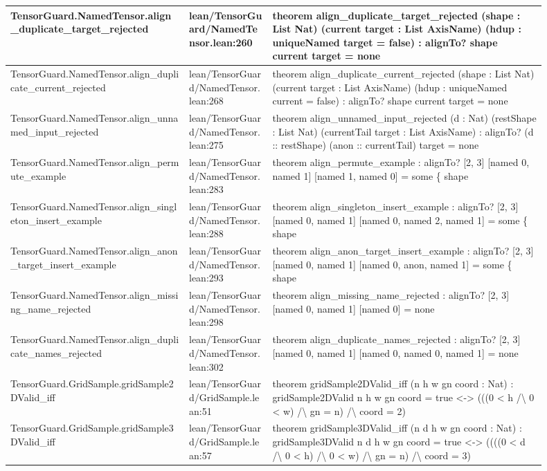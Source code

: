 \documentclass[10pt]{article}
\begin{document}
\begin{longtable}{|p{0.30\linewidth}|p{0.14\linewidth}|p{0.46\linewidth}|}
\hline
TensorGuard.NamedTensor.align\_duplicate\_target\_rejected & lean/TensorGuard/NamedTensor.lean:260 & theorem align\_duplicate\_target\_rejected (shape : List Nat) (current target : List AxisName) (hdup : uniqueNamed target = false) : alignTo? shape current target = none \\
\hline
TensorGuard.NamedTensor.align\_duplicate\_current\_rejected & lean/TensorGuard/NamedTensor.lean:268 & theorem align\_duplicate\_current\_rejected (shape : List Nat) (current target : List AxisName) (hdup : uniqueNamed current = false) : alignTo? shape current target = none \\
\hline
TensorGuard.NamedTensor.align\_unnamed\_input\_rejected & lean/TensorGuard/NamedTensor.lean:275 & theorem align\_unnamed\_input\_rejected (d : Nat) (restShape : List Nat) (currentTail target : List AxisName) : alignTo? (d :: restShape) (anon :: currentTail) target = none \\
\hline
TensorGuard.NamedTensor.align\_permute\_example & lean/TensorGuard/NamedTensor.lean:283 & theorem align\_permute\_example : alignTo? [2, 3] [named 0, named 1] [named 1, named 0] = some \{ shape \\
\hline
TensorGuard.NamedTensor.align\_singleton\_insert\_example & lean/TensorGuard/NamedTensor.lean:288 & theorem align\_singleton\_insert\_example : alignTo? [2, 3] [named 0, named 1] [named 0, named 2, named 1] = some \{ shape \\
\hline
TensorGuard.NamedTensor.align\_anon\_target\_insert\_example & lean/TensorGuard/NamedTensor.lean:293 & theorem align\_anon\_target\_insert\_example : alignTo? [2, 3] [named 0, named 1] [named 0, anon, named 1] = some \{ shape \\
\hline
TensorGuard.NamedTensor.align\_missing\_name\_rejected & lean/TensorGuard/NamedTensor.lean:298 & theorem align\_missing\_name\_rejected : alignTo? [2, 3] [named 0, named 1] [named 0] = none \\
\hline
TensorGuard.NamedTensor.align\_duplicate\_names\_rejected & lean/TensorGuard/NamedTensor.lean:302 & theorem align\_duplicate\_names\_rejected : alignTo? [2, 3] [named 0, named 1] [named 0, named 0, named 1] = none \\
\hline
TensorGuard.GridSample.gridSample2DValid\_iff & lean/TensorGuard/GridSample.lean:51 & theorem gridSample2DValid\_iff (n h w gn coord : Nat) : gridSample2DValid n h w gn coord = true <-> (((0 < h /\textbackslash{} 0 < w) /\textbackslash{} gn = n) /\textbackslash{} coord = 2) \\
\hline
TensorGuard.GridSample.gridSample3DValid\_iff & lean/TensorGuard/GridSample.lean:57 & theorem gridSample3DValid\_iff (n d h w gn coord : Nat) : gridSample3DValid n d h w gn coord = true <-> ((((0 < d /\textbackslash{} 0 < h) /\textbackslash{} 0 < w) /\textbackslash{} gn = n) /\textbackslash{} coord = 3) \\

\end{longtable}
\end{document}

